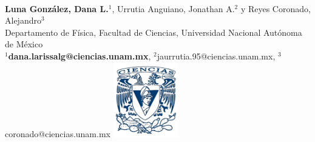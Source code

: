 \documentclass[a0paper,portrait]{baposter}
\begin{document}
\begin{poster}
{		} 
		{%
			\vspace{0.05em}\huge{}
		}
		{%
			\normalsize\vspace{0.5em}\\ 
			{\color{mxpink}\textbf{Luna González, Dana L.$^1$}}, Urrutia Anguiano, Jonathan A.$^2$  y Reyes Coronado, Alejandro$^3$
			\vspace{0.3em}\\
			\footnotesize{Departamento de Física, Facultad de Ciencias, Universidad Nacional 	Autónoma de México
				\vspace{0.2em}\\
				{\color{mxpink}\textbf{$^1$dana.larissalg@ciencias.unam.mx}}, $^2$jaurrutia.95@ciencias.unam.mx, $^3$coronado@ciencias.unam.mx}
		}
		{\includegraphics[width=2.85cm]{logo_ciencias}
		} %
		\vspace*{-10cm} 
\end{poster}
\end{document}
